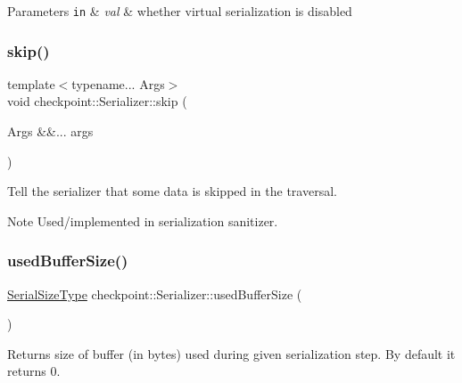\begin{DoxyParams}[1]{Parameters}
\mbox{\tt in}  & {\em val} & whether virtual serialization is disabled \\
\hline
\end{DoxyParams}
\mbox{\label{structcheckpoint_1_1_serializer_ae0224c5bad49a1bd2af178987adb84f9}} 
\subsubsection{\texorpdfstring{skip()}{skip()}}
{\footnotesize\ttfamily template$<$typename... Args$>$ \\
void checkpoint\+::\+Serializer\+::skip (\begin{DoxyParamCaption}\item[{Args \&\&...}]{args }\end{DoxyParamCaption})\hspace{0.3cm}{\ttfamily [inline]}}



Tell the serializer that some data is skipped in the traversal. 

\begin{DoxyNote}{Note}
Used/implemented in serialization sanitizer. 
\end{DoxyNote}
\mbox{\label{structcheckpoint_1_1_serializer_a9193aca9404eadbb6617273d0fb1343b}} 
\subsubsection{\texorpdfstring{used\+Buffer\+Size()}{usedBufferSize()}}
{\footnotesize\ttfamily \hyperlink{namespacecheckpoint_a083f6674da3f94c2901b18c6d238217c}{Serial\+Size\+Type} checkpoint\+::\+Serializer\+::used\+Buffer\+Size (\begin{DoxyParamCaption}{ }\end{DoxyParamCaption})\hspace{0.3cm}{\ttfamily [inline]}}



Returns size of buffer (in bytes) used during given serialization step. By default it returns 0. 


